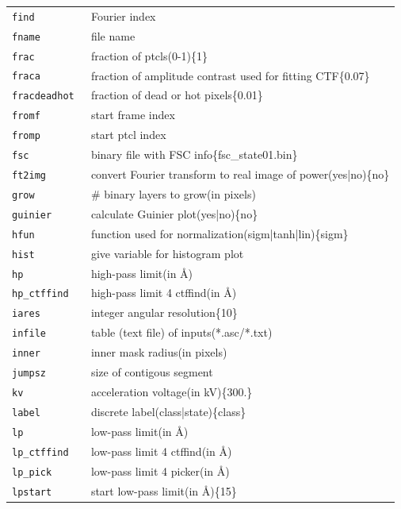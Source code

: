 \documentclass[a4paper,11pt]{article}
\begin{document}
\begin{tabular}{ll}
\texttt{find            }&{ Fourier index}\\
\texttt{fname           }&{ file name}\\
\texttt{frac            }&{ fraction of ptcls(0-1)\{1\}}\\
\texttt{fraca           }&{ fraction of amplitude contrast used for fitting CTF\{0.07\}}\\
\texttt{fracdeadhot     }&{ fraction of dead or hot pixels\{0.01\}}\\
\texttt{fromf           }&{ start frame index}\\
\texttt{fromp           }&{ start ptcl index}\\
\texttt{fsc             }&{ binary file with FSC info\{fsc\_state01.bin\}}\\
\texttt{ft2img          }&{ convert Fourier transform to real image of power(yes|no)\{no\}}\\
\texttt{grow            }&{ \# binary layers to grow(in pixels)}\\
\texttt{guinier         }&{ calculate Guinier plot(yes|no)\{no\}}\\
\texttt{hfun            }&{ function used for normalization(sigm|tanh|lin)\{sigm\}}\\
\texttt{hist            }&{ give variable for histogram plot}\\
\texttt{hp              }&{ high-pass limit(in \AA{})}\\
\texttt{hp\_ctffind      }&{ high-pass limit 4 ctffind(in \AA{})}\\
\texttt{iares           }&{ integer angular resolution\{10\}}\\
\texttt{infile          }&{ table (text file) of inputs(*.asc/*.txt)}\\
\texttt{inner           }&{ inner mask radius(in pixels)}\\
\texttt{jumpsz          }&{ size of contigous segment}\\
\texttt{kv              }&{ acceleration voltage(in kV)\{300.\}}\\
\texttt{label           }&{ discrete label(class|state)\{class\}}\\
\texttt{lp              }&{ low-pass limit(in \AA{})}\\
\texttt{lp\_ctffind      }&{ low-pass limit 4 ctffind(in \AA{})}\\
\texttt{lp\_pick         }&{ low-pass limit 4 picker(in \AA{})}\\
\texttt{lpstart         }&{ start low-pass limit(in \AA{})\{15\}}\\

\end{tabular}
\end{document}
